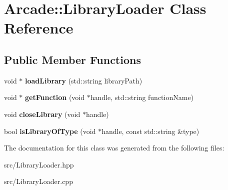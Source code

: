\hypertarget{class_arcade_1_1_library_loader}{}\section{Arcade\+:\+:Library\+Loader Class Reference}
\label{class_arcade_1_1_library_loader}
\subsection*{Public Member Functions}
\begin{DoxyCompactItemize}
\item 
\mbox{\label{class_arcade_1_1_library_loader_a86c84394fa12f14b4f23f9e1d0bbb932}} 
void $\ast$ {\bfseries load\+Library} (std\+::string library\+Path)
\item 
\mbox{\label{class_arcade_1_1_library_loader_afca7cd7281b961989434b65717da8c36}} 
void $\ast$ {\bfseries get\+Function} (void $\ast$handle, std\+::string function\+Name)
\item 
\mbox{\label{class_arcade_1_1_library_loader_a6f10513581d8bc548bc7032ccd139adb}} 
void {\bfseries close\+Library} (void $\ast$handle)
\item 
\mbox{\label{class_arcade_1_1_library_loader_ab05b9e050ece987db0d4409b1ba55069}} 
bool {\bfseries is\+Library\+Of\+Type} (void $\ast$handle, const std\+::string \&type)
\end{DoxyCompactItemize}


The documentation for this class was generated from the following files\+:\begin{DoxyCompactItemize}
\item 
src/Library\+Loader.\+hpp\item 
src/Library\+Loader.\+cpp\end{DoxyCompactItemize}
